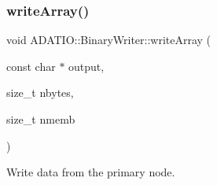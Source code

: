 \mbox{\label{classADATIO_1_1BinaryWriter_a044495ba6e330922b428658b6a8176fc}} 
\subsubsection{\texorpdfstring{writeArray()}{writeArray()}\hspace{0.1cm}{\footnotesize\ttfamily [1/2]}}
{\footnotesize\ttfamily void A\+D\+A\+T\+I\+O\+::\+Binary\+Writer\+::write\+Array (\begin{DoxyParamCaption}\item[{const char $\ast$}]{output,  }\item[{size\+\_\+t}]{nbytes,  }\item[{size\+\_\+t}]{nmemb }\end{DoxyParamCaption})\hspace{0.3cm}{\ttfamily [virtual]}}



Write data from the primary node. 


